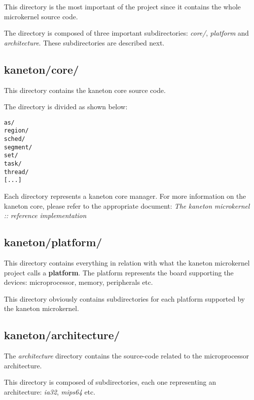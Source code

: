 This directory is the most important of the project since it contains
the whole microkernel source code.

The directory is composed of three important subdirectories: \textit{core/},
\textit{platform} and \textit{architecture}. These subdirectories are described
next.


\subsection*{kaneton/core/}

This directory contains the kaneton core source code.

The directory is divided as shown below:

\begin{verbatim}
as/
region/
sched/
segment/
set/
task/
thread/
[...]
\end{verbatim}

Each directory represents a kaneton core manager. For more information on
the kaneton core, please refer to the appropriate document:
\textit{The kaneton microkernel :: reference implementation}


\subsection*{kaneton/platform/}

This directory contains everything in relation with what the kaneton
microkernel project calls a \textbf{platform}. The platform represents the
board supporting the devices: microprocessor, memory, peripherals etc.

This directory obviously contains subdirectories for each platform
supported by the kaneton microkernel.


\subsection*{kaneton/architecture/}

The \textit{architecture} directory contains the source-code related to
the microprocessor architecture.

This directory is composed of subdirectories, each one representing an
architecture: \textit{ia32}, \textit{mips64} etc.


